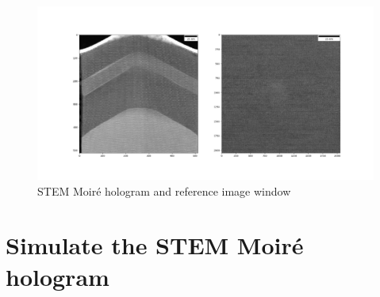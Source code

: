\documentclass[12pt, titlepage]{article}
\begin{document}
\begin{figure}[H]
\centering
\includegraphics[scale=0.35]{Figures/SMH_and_reference_image.png}
\caption{STEM Moir{\'e} hologram and reference image window}
\label{fig:SMH_and_ref}
\end{figure}

\section{Simulate the STEM Moir{\'e} hologram}
\end{document}
